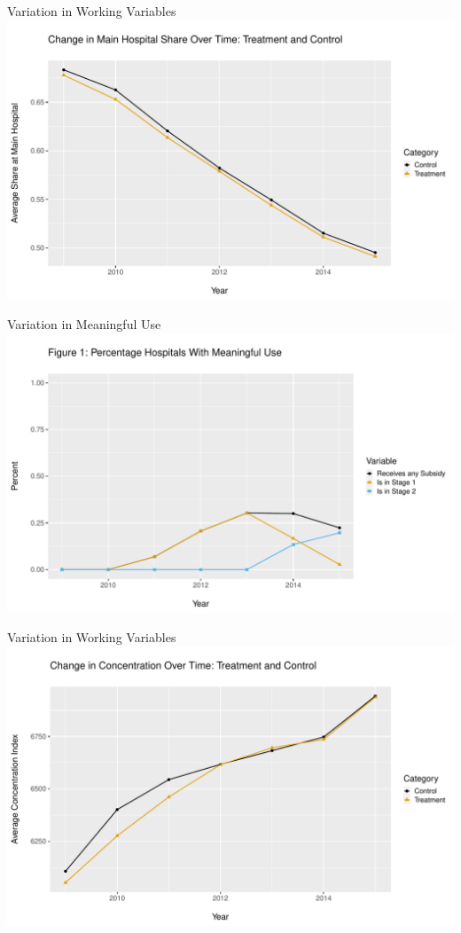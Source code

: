 \documentclass[10pt]{beamer}
\begin{document}
\begin{frame}{Variation in Working Variables}
    \centering
    \includegraphics[scale=.5]{Objects/mainhosp_share_treatvscontrol.pdf}
\end{frame}

\begin{frame}{Variation in Meaningful Use}
    \centering
    \includegraphics[scale=.5]{Objects/TYP_plot_hospmeanuse_year.pdf}
\end{frame}


\begin{frame}{Variation in Working Variables}
\centering
\includegraphics[scale=.5]{Objects/hhi_treatvscontrol.pdf}
\end{frame}
\end{document}
